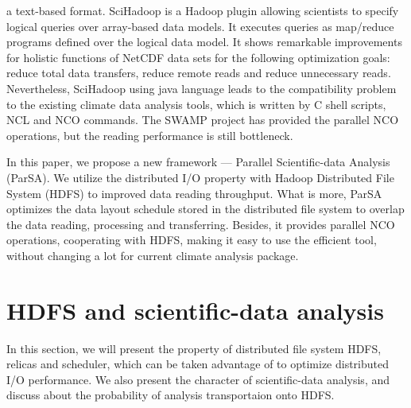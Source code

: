 \documentclass[preprint,12pt]{elsarticle}
\begin{document}
a text-based format\cite{zhao2010parallel}. SciHadoop\cite{buck2011scihadoop} is a Hadoop plugin allowing scientists to specify logical 
queries over array-based data models. It executes queries as map/reduce programs defined over the logical data model. It shows remarkable 
improvements for holistic functions of NetCDF data sets for the following optimization goals: reduce total data transfers, reduce remote 
reads and reduce unnecessary reads. Nevertheless, SciHadoop using java language leads to the compatibility problem to the existing climate 
data analysis tools, which is written by C shell scripts, NCL and NCO commands. The SWAMP project \cite{wang2008clustered} has provided the 
parallel NCO operations, but the reading performance is still bottleneck. \par
In this paper, we propose a new framework --- Parallel Scientific-data Analysis (ParSA). We utilize the distributed I/O property with
Hadoop Distributed File System (HDFS) to improved data reading throughput. What is more, ParSA optimizes the data layout schedule
stored in the distributed file system to overlap the data reading, processing and transferring. Besides, it provides parallel NCO
operations, cooperating with HDFS, making it easy to use the efficient tool, without changing a lot for current climate analysis
package.

\section{HDFS and scientific-data analysis}
In this section, we will present the property of distributed file system HDFS, relicas and scheduler, which can be taken advantage
of to optimize distributed I/O performance. We also present the character of scientific-data analysis, and discuss about the 
probability of analysis transportaion onto HDFS.
\end{document}
